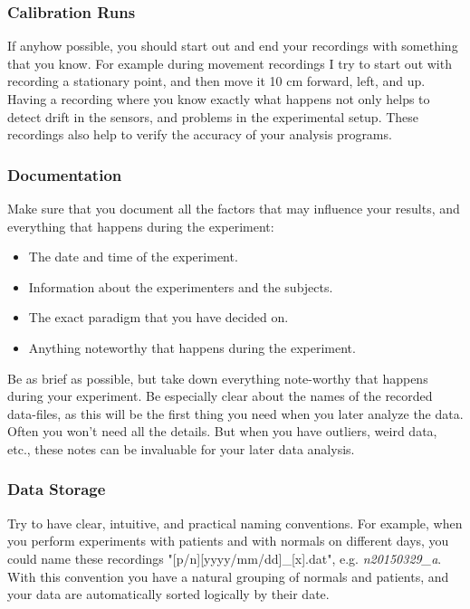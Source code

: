 \subsubsection{Calibration Runs}
If anyhow possible, you should start out and end your recordings with something that you know. For example during movement recordings I try to start out with recording a stationary point, and then move it 10 cm forward, left, and up. Having a recording where you know exactly what happens not only helps to detect drift in the sensors, and problems in the experimental setup. These recordings also help to verify the accuracy of your analysis programs.

\subsubsection{Documentation} 
Make sure that you document all the factors that may influence your results, and everything that happens during the experiment:

\begin{itemize}
  \item The date and time of the experiment.
  \item Information about the experimenters and the subjects.
  \item The exact paradigm that you have decided on.
  \item Anything noteworthy that happens during the experiment.
\end{itemize}

Be as brief as possible, but take down everything note-worthy that happens during your experiment. Be especially clear about the names of the recorded data-files, as this will be the first thing you need when you later analyze the data.
Often you won't need all the details. But when you have outliers, weird data, etc., these notes can be invaluable for your later data analysis.

\subsubsection{Data Storage}
Try to have clear, intuitive, and practical naming conventions. For example, when you perform experiments with patients and with normals on different days, you could name these recordings "[p/n][yyyy/mm/dd]\_[x].dat", e.g. \emph{n20150329\_a}. With this convention you have a natural grouping of normals and patients, and your data are automatically sorted logically by their date.

